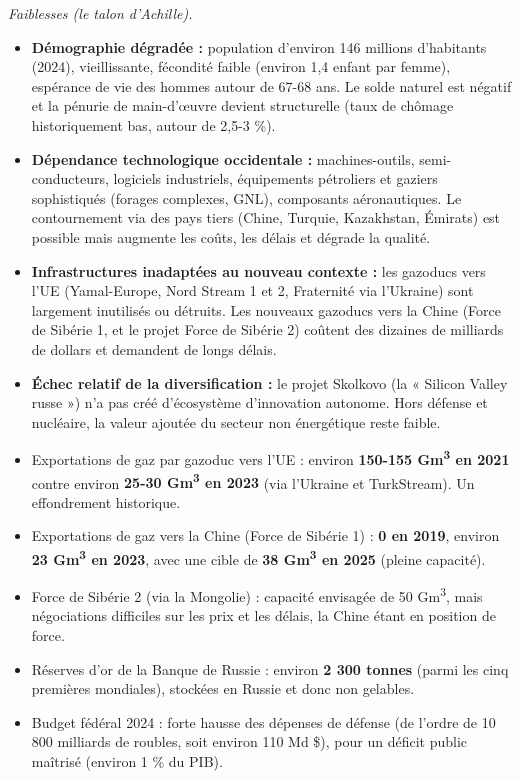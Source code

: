 \documentclass[11pt]{article}
\begin{document}
\emph{Faiblesses (le talon d'Achille).}
\begin{itemize}
    \item \textbf{Démographie dégradée :} population d'environ 146 millions d'habitants (2024), vieillissante, fécondité faible (environ 1,4 enfant par femme), espérance de vie des hommes autour de 67-68 ans. Le solde naturel est négatif et la pénurie de main-d'œuvre devient structurelle (taux de chômage historiquement bas, autour de 2,5-3 \%).
    \item \textbf{Dépendance technologique occidentale :} machines-outils, semi-conducteurs, logiciels industriels, équipements pétroliers et gaziers sophistiqués (forages complexes, GNL), composants aéronautiques. Le contournement via des pays tiers (Chine, Turquie, Kazakhstan, Émirats) est possible mais augmente les coûts, les délais et dégrade la qualité.
    \item \textbf{Infrastructures inadaptées au nouveau contexte :} les gazoducs vers l'UE (Yamal-Europe, Nord Stream 1 et 2, Fraternité via l'Ukraine) sont largement inutilisés ou détruits. Les nouveaux gazoducs vers la Chine (Force de Sibérie 1, et le projet Force de Sibérie 2) coûtent des dizaines de milliards de dollars et demandent de longs délais.
    \item \textbf{Échec relatif de la diversification :} le projet Skolkovo (la « Silicon Valley russe ») n'a pas créé d'écosystème d'innovation autonome. Hors défense et nucléaire, la valeur ajoutée du secteur non énergétique reste faible.
\end{itemize}

\begin{exemplebox}
\begin{itemize}
    \item Exportations de gaz par gazoduc vers l'UE : environ \textbf{150-155 Gm\textsuperscript{3} en 2021} contre environ \textbf{25-30 Gm\textsuperscript{3} en 2023} (via l'Ukraine et TurkStream). Un effondrement historique.
    \item Exportations de gaz vers la Chine (Force de Sibérie 1) : \textbf{0 en 2019}, environ \textbf{23 Gm\textsuperscript{3} en 2023}, avec une cible de \textbf{38 Gm\textsuperscript{3} en 2025} (pleine capacité).
    \item Force de Sibérie 2 (via la Mongolie) : capacité envisagée de 50 Gm\textsuperscript{3}, mais négociations difficiles sur les prix et les délais, la Chine étant en position de force.
    \item Réserves d'or de la Banque de Russie : environ \textbf{2 300 tonnes} (parmi les cinq premières mondiales), stockées en Russie et donc non gelables.
    \item Budget fédéral 2024 : forte hausse des dépenses de défense (de l'ordre de 10 800 milliards de roubles, soit environ 110 Md \$), pour un déficit public maîtrisé (environ 1 \% du PIB).
\end{itemize}
\end{exemplebox}
\end{document}
